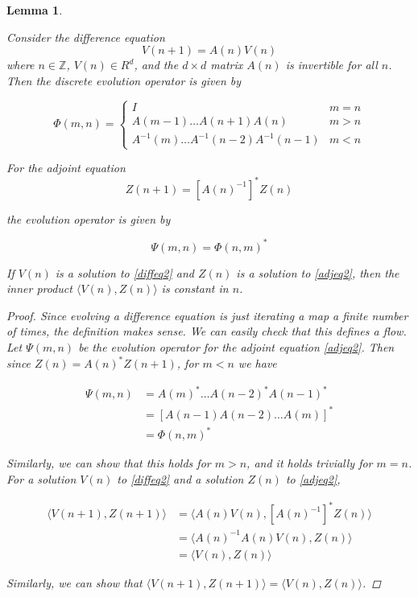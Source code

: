 \documentclass[12pt]{article}
\def\Z{{\mathbb Z}}
\newtheorem{lemma}{Lemma}
\begin{document}
\begin{lemma}\label{evolop}

Consider the difference equation
\begin{equation}\label{diffeq2}
V(n+1) = A(n) V(n)
\end{equation}
where $n \in \Z$, $V(n) \in R^d$, and the $d \times d$ matrix $A(n)$ is invertible for all $n$. Then the discrete evolution operator is given by

\begin{equation}\label{evol}
\Phi(m, n) = 
\begin{cases}
I & m = n \\
A(m-1) \dots A(n+1) A(n) & m > n \\
A^{-1}(m) \dots A^{-1}(n-2) A^{-1}(n-1) & m < n
\end{cases}
\end{equation}

For the adjoint equation
\begin{equation}\label{adjeq2}
Z(n+1) = [A(n)^{-1}]^* Z(n)
\end{equation}

the evolution operator is given by

\begin{equation}\label{adjevol}
\Psi(m, n) = \Phi(n, m)^*
\end{equation}

If $V(n)$ is a solution to \eqref{diffeq2} and $Z(n)$ is a solution to \eqref{adjeq2}, then the inner product $\langle V(n), Z(n) \rangle$ is constant in $n$.

\begin{proof}
Since evolving a difference equation is just iterating a map a finite number of times, the definition makes sense. We can easily check that this defines a flow. Let $\Psi(m, n)$ be the evolution operator for the adjoint equation \eqref{adjeq2}. Then since $Z(n) = A(n)^* Z(n+1)$, for $m < n$ we have

\begin{align*}
\Psi(m, n) &= A(m)^* \dots A(n-2)^* A(n-1)^* \\
&= [A(n-1) A(n-2) \dots A(m)]^* \\
&= \Phi(n, m)^*
\end{align*}

Similarly, we can show that this holds for $m > n$, and it holds trivially for $m = n$.\\

For a solution $V(n)$ to \eqref{diffeq2} and a solution $Z(n)$ to \eqref{adjeq2},

\begin{align*}
\langle V(n+1), Z(n+1) \rangle &= 
\langle A(n) V(n), [A(n)^{-1}]^* Z(n) \rangle \\
&= \langle A(n)^{-1} A(n) V(n), Z(n) \rangle \\
&= \langle V(n), Z(n) \rangle
\end{align*}

Similarly, we can show that $\langle V(n+1), Z(n+1) \rangle = \langle V(n), Z(n) \rangle$.

\end{proof}
\end{lemma}
\end{document}
